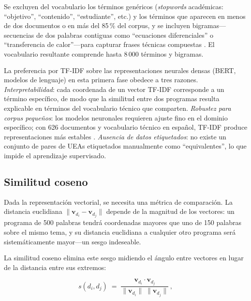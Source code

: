 \documentclass[11pt,a4paper]{article}
\newcommand{\simij}{s(d_i, d_j)}
\begin{document}
Se excluyen del vocabulario los términos genéricos (\textit{stopwords} académicas: ``objetivo'', ``contenido'', ``estudiante'', etc.) y los términos que aparecen en menos de dos documentos o en más del 85\,\% del corpus, y se incluyen bigramas---secuencias de dos palabras contiguas como ``ecuaciones diferenciales'' o ``transferencia de calor''---para capturar frases técnicas compuestas \citep[cap.~2]{Manning2008}.
El vocabulario resultante comprende hasta 8\,000 términos y bigramas.

La preferencia por TF-IDF sobre las representaciones neurales densas (BERT, modelos de lenguaje) en esta primera fase obedece a tres razones.
\textit{Interpretabilidad}: cada coordenada de un vector TF-IDF corresponde a un término específico, de modo que la similitud entre dos programas resulta explicable en términos del vocabulario técnico que comparten.
\textit{Robustez para corpus pequeños}: los modelos neuronales requieren ajuste fino en el dominio específico; con 626 documentos y vocabulario técnico en español, TF-IDF produce representaciones más estables \citep{Turney2010}.
\textit{Ausencia de datos etiquetados}: no existe un conjunto de pares de UEAs etiquetados manualmente como ``equivalentes'', lo que impide el aprendizaje supervisado.

\subsection{Similitud coseno}
\label{sec:coseno}

Dada la representación vectorial, se necesita una métrica de comparación.
La distancia euclidiana $\|\mathbf{v}_{d_i} - \mathbf{v}_{d_j}\|$ depende de la magnitud de los vectores: un programa de 500 palabras tendrá coordenadas mayores que uno de 150 palabras sobre el mismo tema, y su distancia euclidiana a cualquier otro programa será sistemáticamente mayor---un sesgo indeseable.

La similitud coseno elimina este sesgo midiendo el ángulo entre vectores en lugar de la distancia entre sus extremos:

\begin{equation}
  \simij \;=\;
  \frac{\mathbf{v}_{d_i} \cdot \mathbf{v}_{d_j}}
       {\|\mathbf{v}_{d_i}\|\;\|\mathbf{v}_{d_j}\|}\,,
  \label{eq:coseno}
\end{equation}
\end{document}
